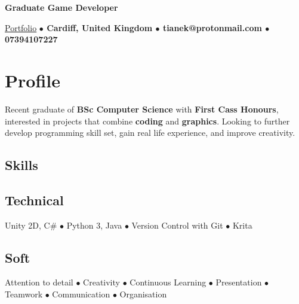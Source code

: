 \documentclass[11pt]{article}
\makeatletter
\newcommand{\verticalline}[1][1pt]{\rule[-0.35ex]{#1}{0.9em}}
\renewcommand{\maketitle}{
\begin{center}
    {\huge\bfseries
    \theauthor \hspace{0.5em}{\verticalline[1.5pt]}\hspace{0.5em}Graduate Game Developer} 

    \vspace{0.7em}

    \ulink{https://orbit-9j.github.io/Portfolio/}{Portfolio} 
    \textbf{$\bullet$  Cardiff, United Kingdom $\bullet$ tianek@protonmail.com  $\bullet$ 07394107227}
\end{center}
}
\newcommand{\ulink}[2]{\href{#1}{\uline{#2}}}
\makeatother
\begin{document}
    \author{Rin Tian}
    \maketitle

    \section{Profile}
    Recent graduate of \textbf{BSc Computer Science} with \textbf{First Cass Honours}, interested in projects that combine \textbf{coding} and \textbf{graphics}. Looking to further develop programming skill set, gain real life experience, and improve creativity. 

    \begin{center}
        \section{Skills} 
        \subsection{Technical}Unity 2D, C\# $\bullet$ Python 3, Java $\bullet$ Version Control with Git $\bullet$ Krita
        
        \subsection{Soft}Attention to detail $\bullet$ Creativity $\bullet$ Continuous Learning $\bullet$
        Presentation $\bullet$ Teamwork $\bullet$ Communication $\bullet$ Organisation 
    \end{center}
   
\end{document}
